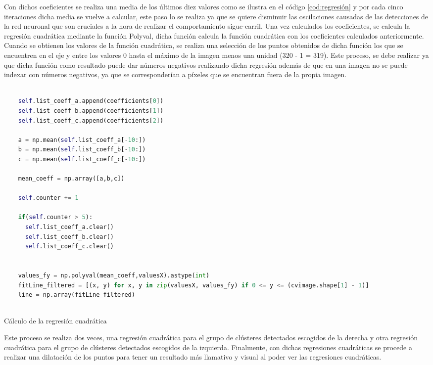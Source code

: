 Con dichos coeficientes se realiza una media de los últimos diez valores como se ilustra en el código \ref{cod:regresión} y por cada cinco iteraciones dicha media se vuelve a calcular, este paso lo se realiza ya que 
se quiere disminuir las oscilaciones causadas de las detecciones de la red neuronal que son cruciales a la hora de realizar el comportamiento sigue-carril. Una vez calculados los coeficientes, se calcula la regresión cuadrática mediante la función Polyval, dicha función calcula
la función cuadrática con los coeficientes calculados anteriormente. \newline 
Cuando se obtienen los valores de la función cuadrática, se realiza una selección de los puntos obtenidos
de dicha función los que se encuentren en el eje y entre los valores 0 hasta el máximo de la imagen menos una unidad (320 - 1 = 319). Este proceso, 
se debe realizar ya que dicha función como resultado puede dar números negativos realizando dicha regresión además de que en una imagen no se puede indexar con números negativos, ya que
se corresponderían a píxeles que se encuentran fuera de la propia imagen. \newline

\begin{code}[H]
  \begin{lstlisting}[language=Python]

    self.list_coeff_a.append(coefficients[0])
    self.list_coeff_b.append(coefficients[1])
    self.list_coeff_c.append(coefficients[2])

    a = np.mean(self.list_coeff_a[-10:])
    b = np.mean(self.list_coeff_b[-10:])
    c = np.mean(self.list_coeff_c[-10:])

    mean_coeff = np.array([a,b,c])

    self.counter += 1

    if(self.counter > 5):
      self.list_coeff_a.clear()
      self.list_coeff_b.clear()
      self.list_coeff_c.clear()  


    values_fy = np.polyval(mean_coeff,valuesX).astype(int)
    fitLine_filtered = [(x, y) for x, y in zip(valuesX, values_fy) if 0 <= y <= (cvimage.shape[1] - 1)]
    line = np.array(fitLine_filtered)
   

  \end{lstlisting}
  \caption[Cálculo de la regresión cuadrática]{Cálculo de la regresión cuadrática}
  \label{cod:regresión}
  \end{code}  

Este proceso se realiza dos veces, una regresión cuadrática para el grupo de clústeres detectados escogidos de la derecha y otra regresión cuadrática para el grupo de clústeres detectados
escogidos de la izquierda. \newline
Finalmente, con dichas regresiones cuadráticas se procede a realizar una dilatación de los puntos para tener un resultado más llamativo y visual al poder
ver las regresiones cuadráticas. 

